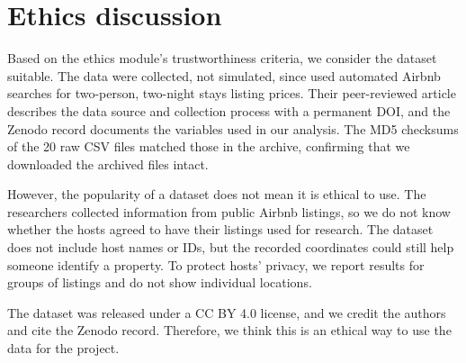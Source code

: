 \section{Ethics discussion}

Based on the ethics module's trustworthiness criteria, we consider the dataset suitable. The data were collected, not simulated, since \citet{gyodi2021} used automated Airbnb searches for two-person, two-night stays listing prices. Their peer-reviewed article describes the data source and collection process with a permanent DOI, and the Zenodo record documents the variables used in our analysis. The MD5 checksums of the 20 raw CSV files matched those in the archive, confirming that we downloaded the archived files intact.

However, the popularity of a dataset does not mean it is ethical to use. The researchers collected information from public Airbnb listings, so we do not know whether the hosts agreed to have their listings used for research. The dataset does not include host names or IDs, but the recorded coordinates could still help someone identify a property. To protect hosts' privacy, we report results for groups of listings and do not show individual locations.

The dataset was released under a CC BY 4.0 license, and we credit the authors and cite the Zenodo record. Therefore, we think this is an ethical way to use the data for the project.
